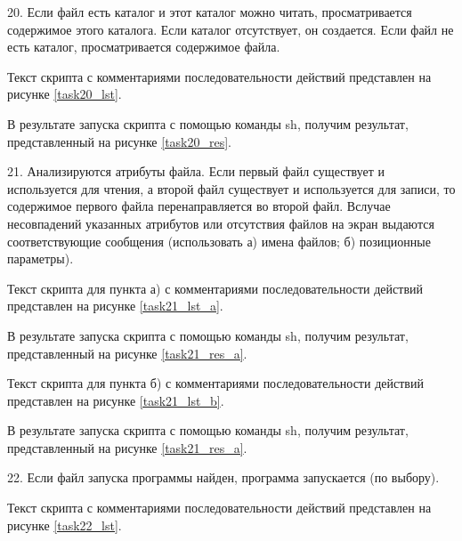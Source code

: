 
20. Если файл есть каталог и этот каталог можно читать, просматривается содержимое этого каталога. Если каталог отсутствует, он создается. Если файл не есть каталог, просматривается содержимое файла.

Текст скрипта с комментариями последовательности действий представлен на рисунке \ref{task20_lst}.


В результате запуска скрипта с помощью команды sh, получим результат, представленный на рисунке \ref{task20_res}.


21. Анализируются  атрибуты  файла.  Если  первый  файл  существует  и используется для чтения, а второй файл существует и используется для записи, то  содержимое  первого  файла  перенаправляется  во  второй  файл.  Вслучае несовпадений указанных атрибутов или отсутствия файлов на экран выдаются соответствующие  сообщения  (использовать  а)  имена  файлов;  б)  позиционные параметры).

Текст скрипта для пункта а) с комментариями последовательности действий представлен на рисунке \ref{task21_lst_a}.


В результате запуска скрипта с помощью команды sh, получим результат, представленный на рисунке \ref{task21_res_a}.


Текст скрипта для пункта б) с комментариями последовательности действий представлен на рисунке \ref{task21_lst_b}.


В результате запуска скрипта с помощью команды sh, получим результат, представленный на рисунке \ref{task21_res_a}.


22. Если  файл  запуска  программы  найден,  программа  запускается  (по выбору).

Текст скрипта с комментариями последовательности действий представлен на рисунке \ref{task22_lst}.

